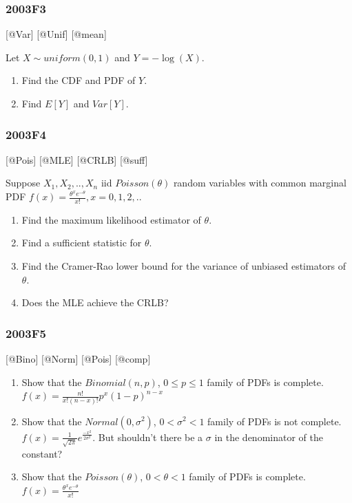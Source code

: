 \documentclass[6pt,Portrait]{article}
\begin{document}
\hypertarget{f3-1}{%
\subsubsection{2003F3}\label{f3-1}}

{[}@Var{]} {[}@Unif{]} {[}@mean{]}

Let \(X\sim uniform(0,1)\) and \(Y=-\log(X)\).

\begin{enumerate}
\def\labelenumi{\Alph{enumi})}
\item
  Find the CDF and PDF of \(Y\).
\item
  Find \(E[Y]\) and \(Var[Y]\).
\end{enumerate}

\hypertarget{f4-1}{%
\subsubsection{2003F4}\label{f4-1}}

{[}@Pois{]} {[}@MLE{]} {[}@CRLB{]} {[}@suff{]}

Suppose \(X_1,X_2,..,X_n\) iid \(Poisson(\theta)\) random variables with
common marginal PDF \(f(x)=\frac{\theta^xe^{-\theta}}{x!},x=0,1,2,..\)

\begin{enumerate}
\def\labelenumi{\Alph{enumi})}
\item
  Find the maximum likelihood estimator of \(\theta\).
\item
  Find a sufficient statistic for \(\theta\).
\item
  Find the Cramer-Rao lower bound for the variance of unbiased
  estimators of \(\theta\).
\item
  Does the MLE achieve the CRLB?
\end{enumerate}

\hypertarget{f5-1}{%
\subsubsection{2003F5}\label{f5-1}}

{[}@Bino{]} {[}@Norm{]} {[}@Pois{]} {[}@comp{]}

\begin{enumerate}
\def\labelenumi{\Alph{enumi})}
\item
  Show that the \(Binomial(n,p)\), \(0\le p\le1\) family of PDFs is
  complete. \(f(x)=\frac{n!}{x!(n-x)!}p^x(1-p)^{n-x}\)
\item
  Show that the \(Normal(0,\sigma^2)\), \(0<\sigma^2<1\) family of PDFs
  is not complete.
  \(f(x)=\frac1{\sqrt{2\pi}}e^{\frac{-x^2}{2\sigma^2}}\). But shouldn't
  there be a \(\sigma\) in the denominator of the constant?
\item
  Show that the \(Poisson(\theta)\), \(0<\theta<1\) family of PDFs is
  complete. \(f(x)=\frac{\theta^xe^{-\theta}}{x!}\)
\end{enumerate}
\end{document}
